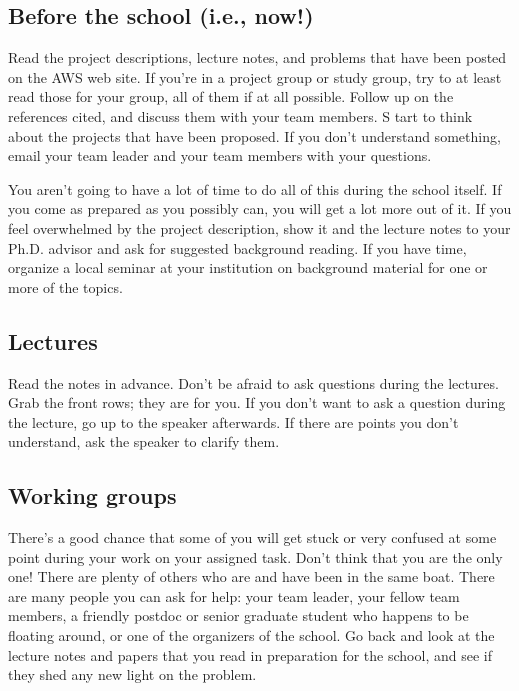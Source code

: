 \documentclass{article}
\begin{document}
\subsection{Before the school (i.e., now!)}
\label{sec:readings}

Read the project descriptions, lecture notes, and problems that have been
posted on the AWS web site.  If you're in a project group or study group, 
try to at least read those for your group, all of them if at all possible. 
Follow up on the references cited, and discuss them with your team members. S
tart to think about the projects that have been proposed. If you don't understand 
something, email your team leader and your team members with your
questions.

You aren't going to have a lot of time to do all of this during the
school itself.  If you come as prepared as you possibly can, you will get a
lot more out of it.  If you feel overwhelmed by the project
description, show it and the lecture notes to your Ph.D. advisor and ask for
suggested background reading. If you have time, organize a local
seminar at your institution on background material for one or more of
the topics. 


\subsection{Lectures}
\label{sec:lectures}
Read the notes in advance.
Don't be afraid to ask questions during the lectures.  Grab the front
rows; they are for you. If you don't want to ask a question during the
lecture, go up to the speaker afterwards. If there are points you
don't understand, ask the speaker to clarify them.


\subsection{Working groups}
\label{sec:working-groups}
There's a good chance that some of you will get stuck or very confused at some point
during your work on your assigned task.  Don't think that you are the only
one!  There are plenty of others who are and have been in the same boat.  
There are many people you can ask for help: your team
leader, your fellow team members, a friendly postdoc or senior
graduate student who happens to be floating around, or one of the
organizers of the school. Go back and look at the lecture notes and
papers that you read in preparation for the school, and see if they
shed any new light on the problem.
\end{document}

